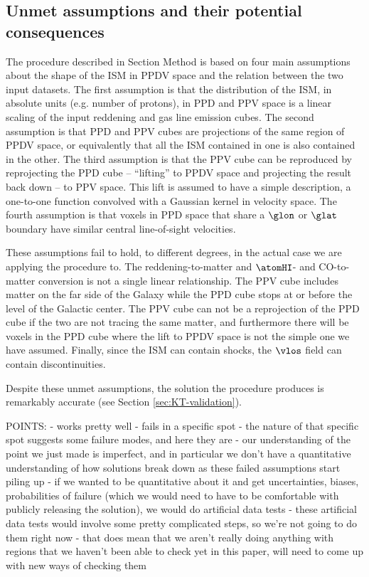 \subsection{Unmet assumptions and their potential consequences}
\label{sec:discussion-systematics}
The procedure described in Section Method is based on four main assumptions about the shape of the ISM in PPDV space and the relation between the two input datasets.
The first assumption is that the distribution of the ISM, in absolute units (e.g. number of protons), in PPD and PPV space is a linear scaling of the input reddening and gas line emission cubes.
The second assumption is that PPD and PPV cubes are projections of the same region of PPDV space, or equivalently that all the ISM contained in one is also contained in the other.
The third assumption is that the PPV cube can be reproduced by reprojecting the PPD cube -- ``lifting'' to PPDV space and projecting the result back down -- to PPV space.
This lift is assumed to have a simple description, a one-to-one function convolved with a Gaussian kernel in velocity space.
The fourth assumption is that voxels in PPD space that share a $\glon$ or $\glat$ boundary have similar central line-of-sight velocities.

These assumptions fail to hold, to different degrees, in the actual case we are applying the procedure to. 
The reddening-to-matter and $\atomHI$- and CO-to-matter conversion is not a single linear relationship. 
The PPV cube includes matter on the far side of the Galaxy while the PPD cube stops at or before the level of the Galactic center.
The PPV cube can not be a reprojection of the PPD cube if the two are not tracing the same matter, and furthermore there will be voxels in the PPD cube where the lift to PPDV space is not the simple one we have assumed.
Finally, since the ISM can contain shocks, the $\vlos$ field can contain discontinuities.

Despite these unmet assumptions, the solution the procedure produces is remarkably accurate (see Section \ref{sec:KT-validation}).


POINTS:
    - works pretty well
    - fails in a specific spot
    - the nature of that specific spot suggests some failure modes, and here they are
    - our understanding of the point we just made is imperfect, and in particular we don't have a quantitative understanding of how solutions break down as these failed assumptions start piling up
    - if we wanted to be quantitative about it and get uncertainties, biases, probabilities of failure (which we would need to have to be comfortable with publicly releasing the solution), we would do artificial data tests
    - these artificial data tests would involve some pretty complicated steps, so we're not going to do them right now
    - that does mean that we aren't really doing anything with regions that we haven't been able to check yet in this paper, will need to come up with new ways of checking them



